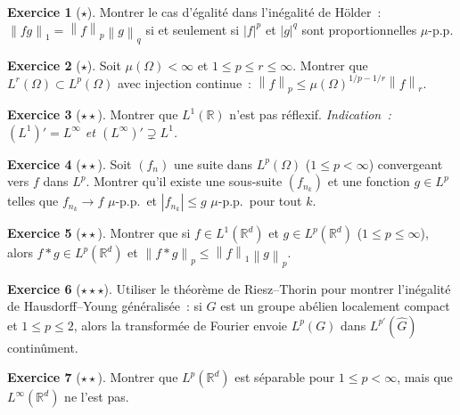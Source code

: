 \documentclass[a4paper,12pt]{book}
\newcommand{\R}{\mathbb{R}}
\newcommand{\norm}[1]{\left\| #1 \right\|}
\newcommand{\abs}[1]{\left| #1 \right|}
\theoremstyle{definition}
\newtheorem{exercice}{Exercice}[chapter]
\theoremstyle{plain}
\theoremstyle{remark}
\begin{document}
\begin{exercice}[$\star$]
Montrer le cas d'égalité dans l'inégalité de Hölder~: $\norm{fg}_1 = \norm{f}_p\norm{g}_q$
si et seulement si $\abs{f}^p$ et $\abs{g}^q$ sont proportionnelles $\mu$-p.p.
\end{exercice}

\begin{exercice}[$\star$]
Soit $\mu(\Omega) < \infty$ et $1 \le p \le r \le \infty$. Montrer que
$L^r(\Omega) \subset L^p(\Omega)$ avec injection continue~:
$\norm{f}_p \le \mu(\Omega)^{1/p - 1/r}\norm{f}_r$.
\end{exercice}

\begin{exercice}[$\star\star$]
Montrer que $L^1(\R)$ n'est pas réflexif.
\emph{Indication~: $(L^1)' = L^\infty$ et $(L^\infty)' \supsetneq L^1$.}
\end{exercice}

\begin{exercice}[$\star\star$]
Soit $(f_n)$ une suite dans $L^p(\Omega)$ ($1 \le p < \infty$) convergeant vers $f$ dans
$L^p$. Montrer qu'il existe une sous-suite $(f_{n_k})$ et une fonction $g \in L^p$ telles
que $f_{n_k} \to f$ $\mu$-p.p.\ et $\abs{f_{n_k}} \le g$ $\mu$-p.p.\ pour tout $k$.
\end{exercice}

\begin{exercice}[$\star\star$]
Montrer que si $f \in L^1(\R^d)$ et $g \in L^p(\R^d)$ ($1 \le p \le \infty$), alors
$f * g \in L^p(\R^d)$ et $\norm{f*g}_p \le \norm{f}_1\norm{g}_p$.
\end{exercice}

\begin{exercice}[$\star\star\star$]
Utiliser le théorème de Riesz--Thorin pour montrer l'inégalité de Hausdorff--Young
généralisée~: si $G$ est un groupe abélien localement compact et $1 \le p \le 2$, alors
la transformée de Fourier envoie $L^p(G)$ dans $L^{p'}(\hat G)$ continûment.
\end{exercice}

\begin{exercice}[$\star\star$]
Montrer que $L^p(\R^d)$ est séparable pour $1 \le p < \infty$, mais que $L^\infty(\R^d)$
ne l'est pas.
\end{exercice}
\end{document}
